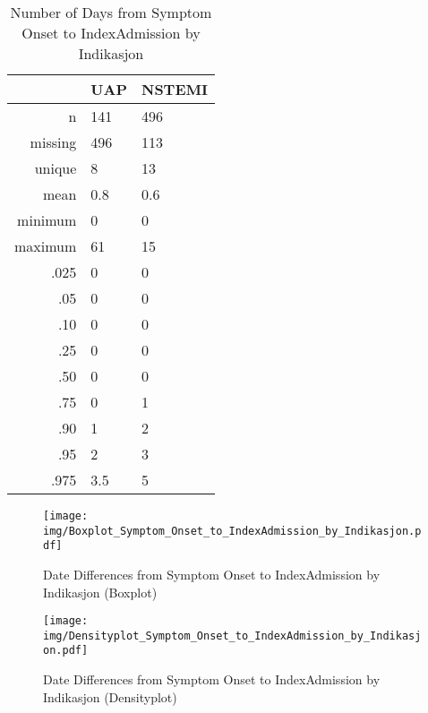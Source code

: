 \documentclass[a4paper]{report}
\begin{document}
\begin{itemize}
{%
\begin{table}[ht]
\centering
\begin{tabular}{rll}
  \toprule
 & UAP & NSTEMI \\ 
  \midrule
n & 141 & 496 \\ 
  missing & 496 & 113 \\ 
  unique & 8 & 13 \\ 
  mean & 0.8 & 0.6 \\ 
  minimum & 0 & 0 \\ 
  maximum & 61 & 15 \\ 
  .025 & 0 & 0 \\ 
  .05 & 0 & 0 \\ 
  .10 & 0 & 0 \\ 
  .25 & 0 & 0 \\ 
  .50 & 0 & 0 \\ 
  .75 & 0 & 1 \\ 
  .90 & 1 & 2 \\ 
  .95 & 2 & 3 \\ 
  .975 & 3.5 & 5 \\ 
   \bottomrule
\end{tabular}
\caption{Number of Days from Symptom Onset to IndexAdmission by Indikasjon} 
\end{table}
\begin{figure}
  \centering
  \caption{Date Differences from Symptom Onset to IndexAdmission by Indikasjon (Boxplot)}
  \label{Boxplot: Date Differences from Symptom Onset to IndexAdmission by Indikasjon}
\texttt{[image: img/Boxplot\_Symptom\_Onset\_to\_IndexAdmission\_by\_Indikasjon.pdf]}\end{figure}


\begin{figure}
  \centering
  \caption{Date Differences from Symptom Onset to IndexAdmission by Indikasjon (Densityplot)}
  \label{Density: Date Differences from Symptom Onset to IndexAdmission by Indikasjon}
\texttt{[image: img/Densityplot\_Symptom\_Onset\_to\_IndexAdmission\_by\_Indikasjon.pdf]}\end{figure}



\clearpage

}
\end{itemize}
\end{document}
